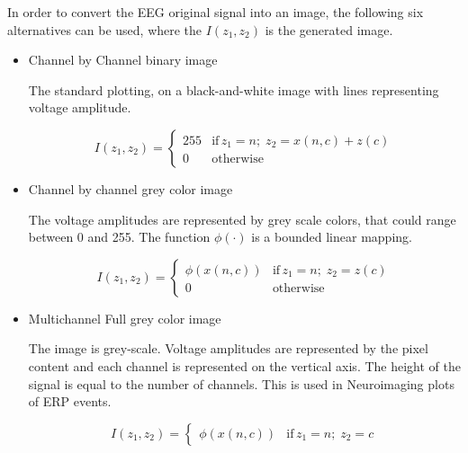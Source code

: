 

In order to convert the EEG original signal into an image, the following six alternatives can be used, where the $I(z_1,z_2)$ is the generated image.

\begin{itemize}
\item Channel by Channel binary image

The standard plotting, on a black-and-white image with lines representing voltage amplitude.

\begin{equation}
I(z_1,z_2) = \left\{ \begin{array}{rl}
255 & \text{if} \,  z_1 =  n; \; z_2 = x(n,c) + z(c) \\
0   & \mbox{otherwise}
\end{array}\right.
\label{eq:images}
\end{equation}

\item Channel by channel grey color image

The voltage amplitudes are represented by grey scale colors, that could range between 0 and 255.  The function $\phi( \cdot )$ is a bounded linear mapping.

\begin{equation}
I(z_1,z_2) = \left\{ \begin{array}{rl}
\phi(x(n,c)) & \text{if} \,  z_1 = n; \; z_2 = z(c) \\
0   & \mbox{otherwise}
\end{array}\right.
\label{eq:images}
\end{equation}

\item Multichannel Full grey color image

The image is grey-scale. Voltage amplitudes are represented by the pixel content and each channel is represented on the vertical axis.  The height of the signal is equal to the number of channels.   This is used in Neuroimaging plots of ERP events.

\begin{equation}
I(z_1,z_2) = \left\{ \begin{array}{rl} \phi(x(n,c))  & \text{if} \,  z_1 = n; \; z_2 = c \end{array}\right.
\label{eq:images}
\end{equation}



\end{itemize}
